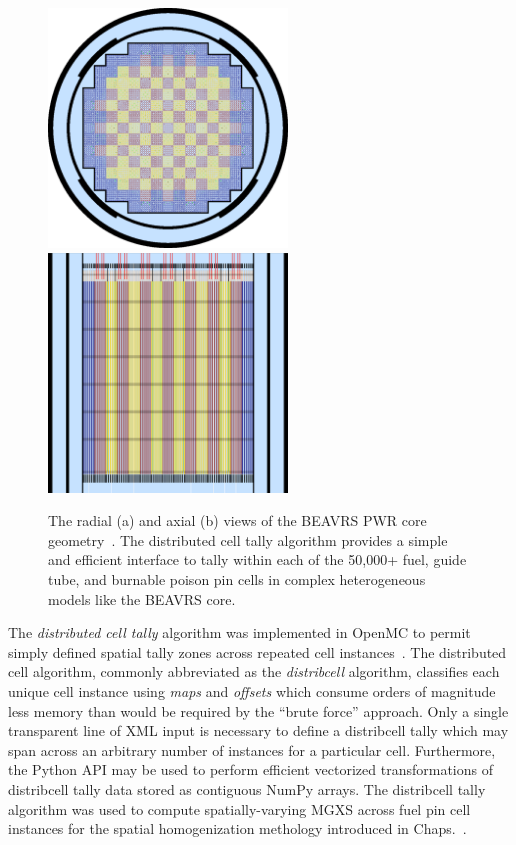 \begin{figure}[h!]
  \centering
  \includegraphics[width=2.5in]{figures/workflow/openmc/core}\hspace{1cm}
  \includegraphics[width=2.5in]{figures/workflow/openmc/core_axial}
\caption[Radial and axial views of the BEAVRS core]{The radial (a) and axial (b) views of the BEAVRS \ac{PWR} core geometry~\cite{horelik2013beavrs}. The distributed cell tally algorithm provides a simple and efficient interface to tally within each of the 50,000+ fuel, guide tube, and burnable poison pin cells in complex heterogeneous models like the \ac{BEAVRS} core.}
\label{fig:beavrs}
\end{figure}

The \textit{distributed cell tally} algorithm was implemented in OpenMC to permit simply defined spatial tally zones across repeated cell instances~\cite{lax2014distribcell}. The distributed cell algorithm, commonly abbreviated as the \textit{distribcell} algorithm, classifies each unique cell instance using \textit{maps} and \textit{offsets} which consume orders of magnitude less memory than would be required by the ``brute force'' approach. Only a single transparent line of \ac{XML} input is necessary to define a distribcell tally which may span across an arbitrary number of instances for a particular cell. Furthermore, the Python \ac{API} may be used to perform efficient vectorized transformations of distribcell tally data stored as contiguous NumPy arrays. The distribcell tally algorithm was used to compute spatially-varying \ac{MGXS} across fuel pin cell instances for the spatial homogenization methology introduced in Chaps.~.

